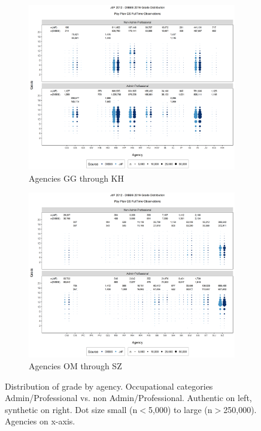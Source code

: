 \documentclass[10pt, letterpaper]{article}
\begin{document}
\begin{spacing}{1.0}
\begin{figure}[]
    \centering
    \begin{subfigure}{1\textwidth}
        \centering
        \includegraphics[width=6in, trim={0 200px 0 165px}, clip]{JdFDIBBSGSFullTimeGradeAdminProfessionalAgency61.png}
        \caption{Agencies GG through KH}
        \vspace{20pt}
    \end{subfigure}
    \begin{subfigure}{1\textwidth}
        \centering
        \includegraphics[width=6in, trim={0 200px 0 165px}, clip]{JdFDIBBSGSFullTimeGradeAdminProfessionalAgency101.png}
        \caption{Agencies OM through SZ}
        \vspace{10pt}
    \end{subfigure}
    \caption{Distribution of grade by agency.  Occupational categories Admin/Professional vs. non Admin/Professional.  Authentic on left, synthetic on right.  Dot size small (n$<$5,000) to large (n$>$250,000).  Agencies on x-axis.}
    \label{figure:JdFDIBBSGSFullTimeGradeAdminProfessionalAgency}
\end{figure}


\end{spacing}
\end{document}

